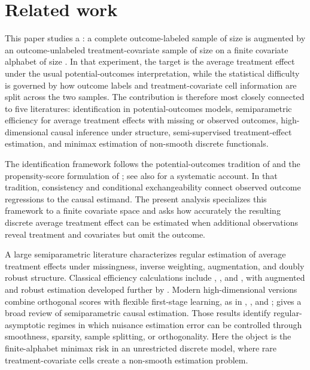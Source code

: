 \section{Related work}\label{sec:related-work}

This paper studies a : a complete outcome-labeled sample of size  is augmented by an outcome-unlabeled treatment-covariate sample of size  on a finite covariate alphabet of size . In that experiment, the target is the average treatment effect under the usual potential-outcomes interpretation, while the statistical difficulty is governed by how outcome labels and treatment-covariate cell information are split across the two samples. The contribution is therefore most closely connected to five literatures: identification in potential-outcomes models, semiparametric efficiency for average treatment effects with missing or observed outcomes, high-dimensional causal inference under structure, semi-supervised treatment-effect estimation, and minimax estimation of non-smooth discrete functionals.

The identification framework follows the potential-outcomes tradition of \citet{Rubin1974} and the propensity-score formulation of \citet{RosenbaumRubin1983}; see also \citet{ImbensRubin2015} for a systematic account. In that tradition, consistency and conditional exchangeability connect observed outcome regressions to the causal estimand. The present analysis specializes this framework to a finite covariate space and asks how accurately the resulting discrete average treatment effect can be estimated when additional observations reveal treatment and covariates but omit the outcome.

A large semiparametric literature characterizes regular estimation of average treatment effects under missingness, inverse weighting, augmentation, and doubly robust structure. Classical efficiency calculations include \citet{RobinsRotnitzkyZhao1994}, \citet{Hahn1998}, and \citet{HiranoImbensRidder2003}, with augmented and robust estimation developed further by \citet{BangRobins2005}. Modern high-dimensional versions combine orthogonal scores with flexible first-stage learning, as in \citet{Farrell2015}, \citet{AtheyImbensWager2018}, and \citet{ChernozhukovChetverikovDemirerDufloHansenNeweyRobins2018}; \citet{Kennedy2016} gives a broad review of semiparametric causal estimation. Those results identify regular-asymptotic regimes in which nuisance estimation error can be controlled through smoothness, sparsity, sample splitting, or orthogonality. Here the object is the finite-alphabet minimax risk in an unrestricted discrete model, where rare treatment-covariate cells create a non-smooth estimation problem.

